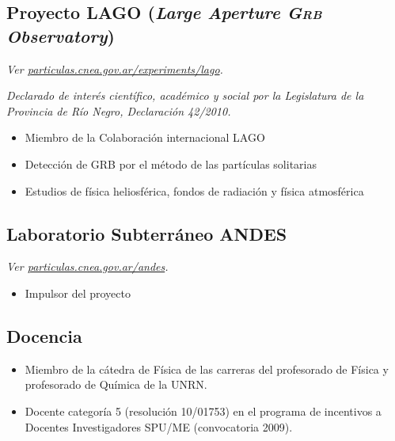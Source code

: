 \documentclass[11pt, a4paper]{article}
\begin{document}
\subsection*{Proyecto LAGO ({\emph{Large Aperture \textsc{Grb} Observatory}})}
\small\textit{Ver
\href{http://particulas.cnea.gov.ar/experiments/lago/}{particulas.cnea.gov.ar/experiments/lago}.
}

{\emph{Declarado de interés científico, académico y social por la Legislatura de la
Provincia de Río Negro, Declaración 42/2010.}}

\begin{itemize}
\item Miembro de la Colaboración internacional LAGO
\item Detección de GRB por el método de las partículas solitarias
\item Estudios de física heliosférica, fondos de radiación y física atmosférica
\end{itemize}

\subsection*{Laboratorio Subterráneo ANDES}
\small\textit{Ver
\href{http://particulas.cnea.gov.ar/andes}{particulas.cnea.gov.ar/andes}.
}
\begin{itemize}
\item Impulsor del proyecto
\end{itemize}

\subsection*{Docencia}
\begin{itemize}
\item Miembro de la cátedra de Física de las carreras del profesorado de Física
y profesorado de Química de la UNRN.
\item Docente categoría 5 (resolución 10/01753) en el programa de incentivos a
Docentes Investigadores SPU/ME (convocatoria 2009). 
\end{itemize}
\end{document}
